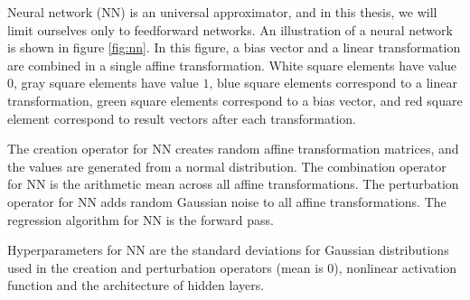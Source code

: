 Neural network (NN) \citep{nn} is an universal approximator, and in this thesis, we will limit ourselves only to feedforward networks. An illustration of a neural network is shown in figure \ref{fig:nn}. In this figure, a bias vector and a linear transformation are combined in a single affine transformation. White square elements have value $0$, gray square elements have value $1$, blue square elements correspond to a linear transformation, green square elements correspond to a bias vector, and red square element correspond to result vectors after each transformation.

The creation operator for NN creates random affine transformation matrices, and the values are generated from a normal distribution. The combination operator for NN is the arithmetic mean across all affine transformations. The perturbation operator for NN adds random Gaussian noise to all affine transformations. The regression algorithm for NN is the forward pass.

Hyperparameters for NN are the standard deviations for Gaussian distributions used in the creation and perturbation operators (mean is $0$), nonlinear activation function and the architecture of hidden layers.


